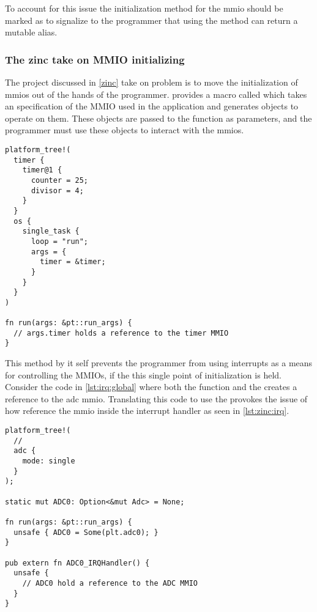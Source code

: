 To account for this issue the initialization method for the \gls{mmio} should be marked as {\unsafe} to signalize to the programmer that using the method can return a mutable alias.

\subsubsection{The zinc take on MMIO initializing}

The  project discussed in \autoref{zinc} take on problem is to move the initialization of \glspl{mmio} out of the hands of the programmer.
 provides a macro called  which takes an specification of the MMIO used in the application and generates objects to operate on them.
These objects are passed to the \main function as parameters, and the programmer must use these objects to interact with the \glspl{mmio}.

\begin{listing}[H]
  \begin{verbatim}
platform_tree!(
  timer {
    timer@1 {
      counter = 25;
      divisor = 4;
    }
  }
  os {
    single_task {
      loop = "run";
      args = {
        timer = &timer;
      }
    }
  }
)

fn run(args: &pt::run_args) {
  // args.timer holds a reference to the timer MMIO
}
  \end{verbatim}
  \caption{}
  \label{lst:zinc:platformtree}
\end{listing}

This method by it self prevents the programmer from using interrupts as a means for controlling the MMIOs, if the this single point of initialization is held.
Consider the code in \autoref{lst:irq:global} where both the \main function and the  creates a reference to the \gls{adc} \gls{mmio}.
Translating this code to use the   provokes the issue of how reference the \gls{mmio} inside the interrupt handler as seen in \autoref{lst:zinc:irq}.

\begin{listing}[H]
  \begin{verbatim}
platform_tree!(
  //
  adc {
    mode: single
  }
);

static mut ADC0: Option<&mut Adc> = None;

fn run(args: &pt::run_args) {
  unsafe { ADC0 = Some(plt.adc0); }
}

pub extern fn ADC0_IRQHandler() {
  unsafe {
    // ADC0 hold a reference to the ADC MMIO
  }
}
  \end{verbatim}
  \caption{}
  \label{lst:zinc:irq}
\end{listing}

